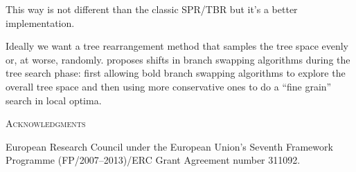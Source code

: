 \documentclass[12pt,letterpaper]{article}
\renewcommand{\section}[1]{%
\bigskip
\begin{center}
\begin{Large}
\normalfont\scshape #1
\medskip
\end{Large}
\end{center}}
\renewcommand{\subsection}[1]{%
\bigskip
\begin{center}
\begin{large}
\normalfont\itshape #1
\end{large}
\end{center}}
\begin{document}




This way is not different than the classic SPR/TBR but it's a better implementation.

Ideally we want a tree rearrangement method that samples the tree space evenly or, at worse, randomly.
\cite{lakner2008efficiency} proposes shifts in branch swapping algorithms during the tree search phase: first allowing bold branch swapping algorithms to explore the overall tree space and then using more conservative ones to do a ``fine grain'' search in local optima.




\section{Acknowledgments}
European Research Council under the European Union’s Seventh Framework Programme (FP/2007–2013)/ERC Grant Agreement number 311092.




\end{document}

